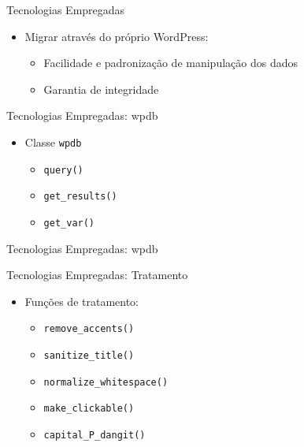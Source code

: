 \documentclass{beamer}
\begin{document}
\begin{frame}{Tecnologias Empregadas}
  \begin{itemize}
    \pause \item Migrar através do próprio WordPress:
    \begin{itemize}
      \pause \item Facilidade e padronização de manipulação dos dados
      \pause \item Garantia de integridade
    \end{itemize}
  \end{itemize}
\end{frame}

\begin{frame}{Tecnologias Empregadas: wpdb}
  \begin{itemize}
    \pause \item Classe \texttt{wpdb}
    \begin{itemize}
      \pause \item \texttt{query()}
      \pause \item \texttt{get\_results()}
      \pause \item \texttt{get\_var()}
    \end{itemize}
  \end{itemize}
\end{frame}

\begin{frame}{Tecnologias Empregadas: wpdb}
  
\end{frame}

\begin{frame}{Tecnologias Empregadas: Tratamento}
  \begin{itemize}
    \pause \item Funções de tratamento:
    \begin{itemize}
      \pause \item \texttt{remove\_accents()}
      \pause \item \texttt{sanitize\_title()}
      \pause \item \texttt{normalize\_whitespace()}
      \pause \item \texttt{make\_clickable()}
      \pause \item \texttt{capital\_P\_dangit()}
    \end{itemize}
  \end{itemize}
\end{frame}
\end{document}

